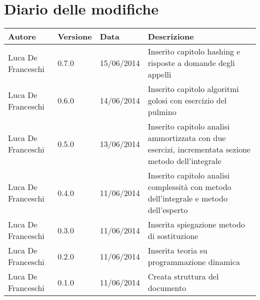 \section*{Diario delle modifiche}

\begin{center}

	\begin{table}[htpd]
		\begin{tabular}{| l | l | l | p{50mm} |}
			\hline
			\hline
			\textbf{Autore} & \textbf{Versione} & \textbf{Data} & \textbf{Descrizione} \\
			\hline
			\hline
			Luca De Franceschi & 0.7.0 & 15/06/2014 & Inserito capitolo hashing e risposte a domande degli appelli \\ \hline
			Luca De Franceschi & 0.6.0 & 14/06/2014 & Inserito capitolo algoritmi golosi con esercizio del pulmino \\ \hline
			Luca De Franceschi & 0.5.0 & 13/06/2014 & Inserito capitolo analisi ammortizzata con due esercizi, incrementata sezione metodo dell'integrale \\ \hline
			Luca De Franceschi & 0.4.0 & 11/06/2014 & Inserito capitolo analisi complessità con metodo dell'integrale e metodo dell'esperto \\ \hline
			Luca De Franceschi & 0.3.0 & 11/06/2014 & Inserita spiegazione metodo di sostituzione \\ \hline
			Luca De Franceschi & 0.2.0 & 11/06/2014 & Inserita teoria su programmazione dinamica \\ \hline
			Luca De Franceschi & 0.1.0 & 11/06/2014 & Creata struttura del documento \\ \hline
		\end{tabular}
	\end{table}
	
\end{center}